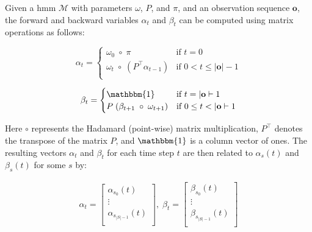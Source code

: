 Given a \gls{hmm} $\mathcal{M}$ with parameters $\omega$, $P$, and $\pi$, and an observation sequence $\mathbf{o}$, the forward and backward variables $\alpha_t$ and $\beta_t$ can be computed using matrix operations as follows:

\begin{equation}
    \label{eq:alpha}
    \alpha_t =
    \begin{cases}
        \omega_0 \; \circ \; \pi   & \text{if } t = 0    \\
        \omega_t \; \circ \; \left( {P}^\top \alpha_{t - 1} \right)   & \text{if } 0 < t \leq |\mathbf{o}|-1 \\
    \end{cases}
\end{equation}


\begin{equation}
    \label{eq:beta}
    {\beta}_t =
    \begin{cases}
        \mathbbm{1} & \text{if } t = |\mathbf{o}|-1        \\
        {P} \; ({\beta}_{t + 1} \; \circ \; {\omega}_{t + 1}) & \text{if } 0 \leq t < |\mathbf{o}|-1 \\
    \end{cases}
\end{equation}

Here $\circ$ represents the Hadamard (point-wise) matrix multiplication, ${P}^\top$ denotes the transpose of the matrix ${P}$, and $\mathbbm{1}$ is a column vector of ones.
The resulting vectors ${\alpha}_t$ and ${\beta}_t$ for each time step $t$ are then related to $\alpha_s(t)$ and $\beta_s(t)$ for some $s$ by:

\begin{align}
{\alpha}
    _t = \begin{bmatrix}
             \alpha_{s_0}(t)       \\
             \vdots                \\
             \alpha_{s_{|S|-1}}(t) \\
    \end{bmatrix}, \;
    {\beta}_t = \begin{bmatrix}
                    \beta_{s_0}(t)       \\
                    \vdots               \\
                    \beta_{s_{|S|-1}}(t) \\
    \end{bmatrix}
\end{align}

